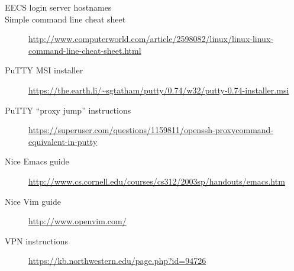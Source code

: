 \documentclass{tufte-handout}
\def\PuTTYurl{https://the.earth.li/~sgtatham/putty/0.74/w32/putty-0.74-installer.msi}
\def\GlobalProtectUrl{https://kb.northwestern.edu/page.php?id=94726}
\def\PuTTYhelpUrl{https://superuser.com/questions/1159811/openssh-proxycommand-equivalent-in-putty}
\begin{document}
\begin{description}

\item[EECS login server hostnames]
\LabHostnamesLink

\item[Simple command line cheat sheet]
\url{http://www.computerworld.com/article/2598082/linux/linux-linux-command-line-cheat-sheet.html}

\item[PuTTY MSI installer]
\url{\PuTTYurl}

\item[PuTTY ``proxy jump'' instructions]
\url{\PuTTYhelpUrl}

\item[Nice Emacs guide]
\url{http://www.cs.cornell.edu/courses/cs312/2003sp/handouts/emacs.htm}

\item[Nice Vim guide]
\url{http://www.openvim.com/}

\item[VPN instructions]
\url{\GlobalProtectUrl}

\end{description}
\end{document}
